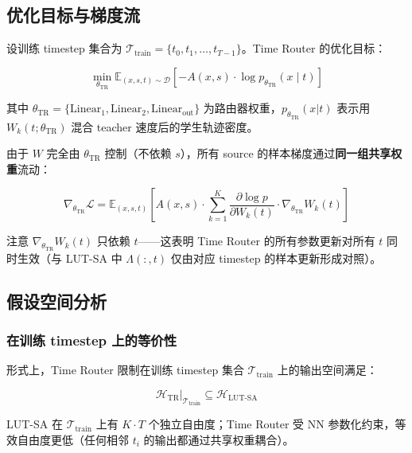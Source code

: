 \documentclass[11pt,a4paper]{article}
\begin{document}
\subsection{优化目标与梯度流}

设训练 timestep 集合为 $\mathcal{T}_{\text{train}} = \{t_0, t_1, \ldots, t_{T-1}\}$。Time Router 的优化目标：

\begin{equation}
\min_{\theta_{\text{TR}}} \mathbb{E}_{(x, s, t) \sim \mathcal{D}} \left[
    -A(x, s) \cdot \log p_{\theta_{\text{TR}}}(x \mid t)
\right]
\label{eq:time_router_obj}
\end{equation}

其中 $\theta_{\text{TR}} = \{\text{Linear}_1, \text{Linear}_2, \text{Linear}_{\text{out}}\}$ 为路由器权重，$p_{\theta_{\text{TR}}}(x|t)$ 表示用 $W_k(t; \theta_{\text{TR}})$ 混合 teacher 速度后的学生轨迹密度。

由于 $W$ 完全由 $\theta_{\text{TR}}$ 控制（不依赖 $s$），所有 source 的样本梯度通过\textbf{同一组共享权重}流动：

\begin{equation}
\nabla_{\theta_{\text{TR}}} \mathcal{L}
= \mathbb{E}_{(x, s, t)} \left[
    A(x, s) \cdot \sum_{k=1}^K \frac{\partial \log p}{\partial W_k(t)} \cdot \nabla_{\theta_{\text{TR}}} W_k(t)
\right]
\label{eq:time_router_grad}
\end{equation}

注意 $\nabla_{\theta_{\text{TR}}} W_k(t)$ 只依赖 $t$——这表明 Time Router 的所有参数更新对所有 $t$ 同时生效（与 LUT-SA 中 $\Lambda(:,t)$ 仅由对应 timestep 的样本更新形成对照）。

\subsection{假设空间分析}

\subsubsection{在训练 timestep 上的等价性}

形式上，Time Router 限制在训练 timestep 集合 $\mathcal{T}_{\text{train}}$ 上的输出空间满足：

\begin{equation}
\mathcal{H}_{\text{TR}}\big|_{\mathcal{T}_{\text{train}}} \subseteq \mathcal{H}_{\text{LUT-SA}}
\label{eq:tr_subset_lut}
\end{equation}

LUT-SA 在 $\mathcal{T}_{\text{train}}$ 上有 $K \cdot T$ 个独立自由度；Time Router 受 NN 参数化约束，等效自由度更低（任何相邻 $t_i$ 的输出都通过共享权重耦合）。
\end{document}
